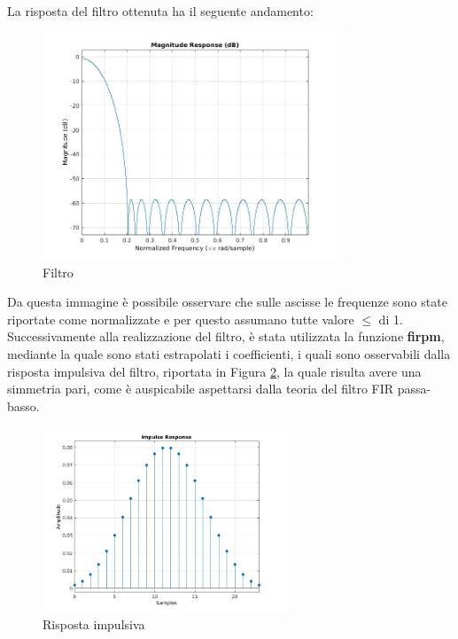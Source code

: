 \documentclass[a4paper, titlepage]{article}
\begin{document}
La risposta del filtro ottenuta ha il seguente andamento:

\begin{figure}[H]
    \centering
    \includegraphics[width=0.8\textwidth]{filtro.jpg}
    \caption{Filtro}
    \label{fig:filter}
\end{figure}

\noindent Da questa immagine è possibile osservare che sulle ascisse le frequenze sono state riportate come normalizzate e per questo assumano tutte valore $\leq$ di 1.\\Successivamente alla realizzazione del filtro, è stata utilizzata la funzione \textbf{firpm}, mediante la quale sono stati estrapolati i coefficienti, i quali sono osservabili dalla risposta impulsiva del filtro, riportata in Figura \ref{fig:risposta impulsiva}, la quale risulta avere una simmetria pari, come è auspicabile aspettarsi dalla teoria del filtro FIR passa-basso.

\begin{figure}[H]
    \centering
    \includegraphics[width=0.65\textwidth]{risposta_impulsiva_filtro.jpg}
    \caption{Risposta impulsiva}
    \label{fig:risposta impulsiva}
\end{figure}
\end{document}
